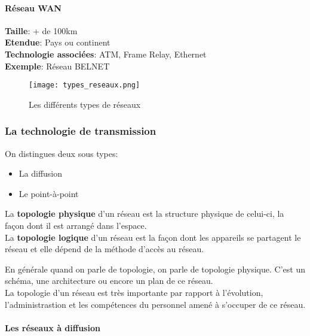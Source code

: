  \paragraph{Réseau WAN}\leavevmode

 \medskip

 \indent
 \textbf{Taille}: + de 100km\\
 \indent
 \textbf{Etendue}: Pays ou continent\\
 \indent
 \textbf{Technologie associées}: ATM, Frame Relay, Ethernet\\
 \indent
 \textbf{Exemple}: Réseau BELNET\\

 \begin{figure}[h]
	 \centering
	 \texttt{[image: types\_reseaux.png]}
	 \caption{Les différents types de réseaux}
 \end{figure}

 \subsubsection{La technologie de transmission}
 On distingues deux sous types:
 \begin{itemize}
	 \item La diffusion
	 \item Le point-à-point
 \end{itemize}

 \indent
 La \textbf{topologie physique} d'un réseau est la structure physique de celui-ci, la façon dont il est arrangé dans l'espace.\\
 \indent
 La \textbf{topologie logique} d'un réseau est la façon dont les appareils se partagent le réseau et elle dépend de la méthode d'accès au réseau.\\

 \smallskip

 \indent
 En générale quand on parle de topologie, on parle de topologie physique. C'est un schéma, une architecture ou encore un plan de ce réseau.\\
 La topologie d'un réseau est très importante par rapport à l'évolution, l'administrastion et les compétences du personnel amené à s'occuper de ce réseau.
 \paragraph{Les réseaux à diffusion}\leavevmode

 \smallskip

